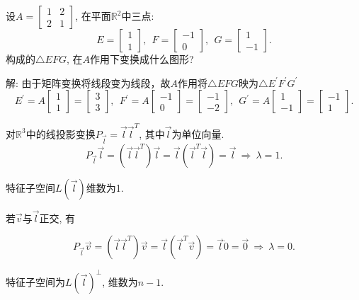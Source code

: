 \begin{eg}
设$A=\begin{bmatrix}1&2\\2&1\end{bmatrix}$, 在平面$\mathbb{R}^2$中三点:
$$E=\begin{bmatrix}1\\1\end{bmatrix}, \ \ F=\begin{bmatrix}-1\\0\end{bmatrix}, \ \
G=\begin{bmatrix}1\\-1\end{bmatrix}.$$
构成的$\triangle EFG$, 在$A$作用下变换成什么图形?
\end{eg}
解: 由于矩阵变换将线段变为线段，故$A$作用将$\triangle EFG$映为$\triangle E^{'}F^{'}G^{'}$
$$E^{'}=A\begin{bmatrix}1\\1\end{bmatrix}=\begin{bmatrix}3\\3\end{bmatrix},\ \ F^{'}=A\begin{bmatrix}-1\\0\end{bmatrix}=\begin{bmatrix}-1\\-2\end{bmatrix},\ \ G^{'}=A\begin{bmatrix}1\\-1\end{bmatrix}=\begin{bmatrix}-1\\1\end{bmatrix}.$$


\begin{eg}
对$\mathbb{R}^3$中的线投影变换$P_{\vec{l}}=\vec{l}\vec{l}^T$, 其中$\vec{l}$为单位向量.
\begin{displaymath}P_{\vec{l}}\vec{l}=(\vec{l}\vec{l}^T)\vec{l}
=\vec{l}(\vec{l}^T\vec{l})=\vec{l}\ \Rightarrow\ \lambda=1.\end{displaymath}

特征子空间$L(\vec{l})$维数为1.

若$\vec{v}$与$\vec{l}$正交, 有

$$P_{\vec{l}}\vec{v}=(\vec{l}\vec{l}^T)\vec{v}
=\vec{l}(\vec{l}^T\vec{v})=\vec{l}\dot 0=\vec{0}\ \Rightarrow \ \lambda=0.$$

特征子空间为$L(\vec{l})^{\bot}$, 维数为$n-1$.

\end{eg}

